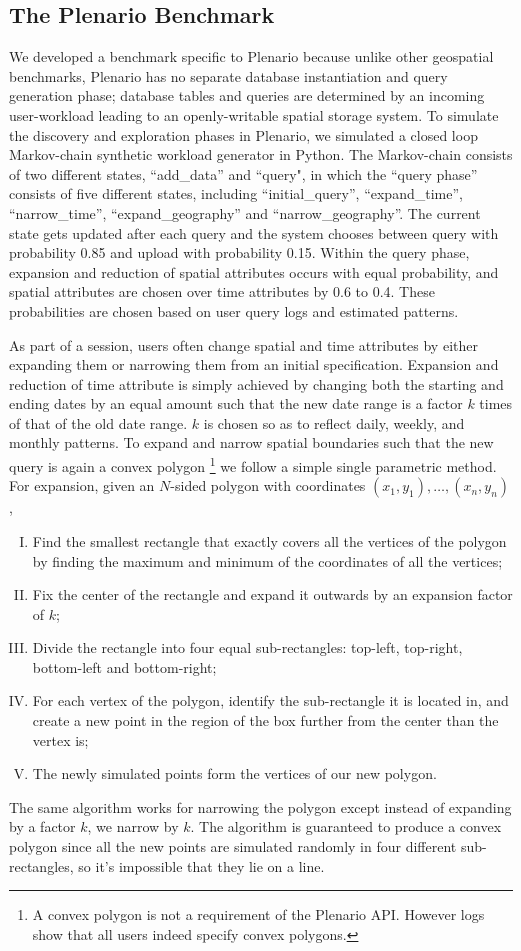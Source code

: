 \documentclass[11pt]{article}
\begin{document}
\subsection{The Plenario Benchmark}
We developed a benchmark specific to Plenario because unlike other geospatial benchmarks, Plenario has no separate database instantiation and query generation phase; database tables and queries are determined by an incoming user-workload leading to an openly-writable spatial storage system. To simulate the discovery and exploration phases in Plenario, we simulated a closed loop Markov-chain synthetic workload generator in Python. The  Markov-chain consists of two different states, ``add\_data'' and ``query", in which the ``query phase'' consists of five different states, including ``initial\_query'', ``expand\_time'', ``narrow\_time'', ``expand\_geography'' and ``narrow\_geography''.
The current state gets updated after each query and the system chooses between query with probability 0.85 and upload with probability 0.15. Within the query phase, expansion and reduction of spatial attributes occurs with equal probability, and spatial attributes are chosen over time attributes by 0.6 to 0.4. These probabilities are chosen based on user query logs and estimated patterns. 

As part of a session, users often change spatial and time attributes by either expanding them or narrowing them from an initial specification. Expansion and reduction of time attribute is simply achieved by changing both the starting and ending dates by an equal amount such that the new date range is a factor $k$ times of that of the old date range. $k$ is chosen so as to reflect daily, weekly, and monthly patterns. To expand and narrow spatial boundaries such that the new query is again a convex polygon \footnote{A convex polygon is not a requirement of the Plenario API. However logs show that all users indeed specify convex polygons.} we follow a simple single parametric method. For expansion, given an $N$-sided polygon with coordinates $(x_1,y_1),\ldots,(x_n, y_n)$,
\begin{enumerate}[I.]
\itemsep0em 
 \item Find the smallest rectangle that exactly covers all the vertices of the polygon by finding the maximum and minimum of the coordinates of all the vertices; 
 \item Fix the center of the rectangle and expand it outwards by an expansion factor of $k$; 
 \item Divide the rectangle into four equal sub-rectangles: top-left, top-right, bottom-left and bottom-right; 
 \item For each vertex of the polygon, identify the sub-rectangle it is located in, and create a new point in the region of the box further from the center than the vertex is;
 \item The newly simulated points form the vertices of our new polygon. 
 \end{enumerate}
 The same algorithm works for narrowing the polygon except instead of expanding by a factor $k$, we narrow by $k$. The algorithm is guaranteed to produce a convex polygon since all the new points are simulated randomly in four different sub-rectangles, so it's impossible that they lie on a line.
 
\end{document}
